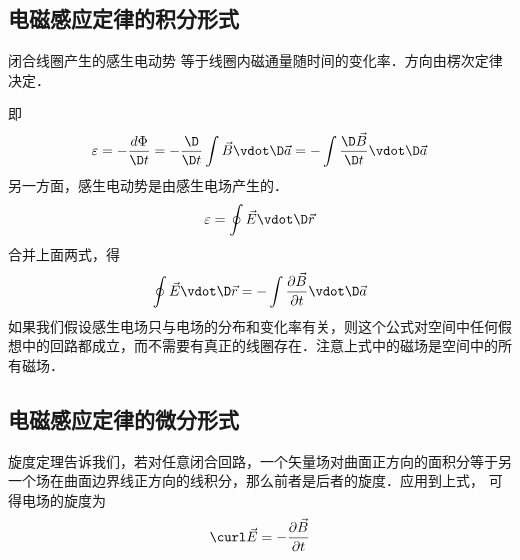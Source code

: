 

\subsection{电磁感应定律的积分形式}

闭合线圈产生的感生电动势%
等于线圈内磁通量随时间的变化率．方向由楞次定律%
决定．

即
\begin{equation}
\varepsilon  =  - \frac{{d\Phi }}{{\D t}} =  - \frac{\D }{{\D t}}\int {\vec B \vdot \D \vec a}  =  - \int {\frac{{\D \vec B}}{{\D t}} \vdot \D \vec a} 
\end{equation} 
另一方面，感生电动势是由感生电场产生的． 
\begin{equation}
\varepsilon  = \oint {\vec E \vdot \D \vec r} 
\end{equation} 
合并上面两式，得
\begin{equation}
\oint {\vec E \vdot \D \vec r}  =  - \int {\frac{{\partial \vec B}}{{\partial t}} \vdot \D \vec a} 
\end{equation} 
如果我们假设感生电场只与电场的分布和变化率有关，则这个公式对空间中任何假想中的回路都成立，而不需要有真正的线圈存在．注意上式中的磁场是空间中的所有磁场． 
\subsection{电磁感应定律的微分形式}

旋度定理告诉我们，若对任意闭合回路，一个矢量场对曲面正方向的面积分等于另一个场在曲面边界线正方向的线积分，那么前者是后者的旋度．应用到上式， 可得电场的旋度为
\begin{equation}
\curl \vec E =  - \frac{{\partial \vec B}}{{\partial t}}
\end{equation} 

